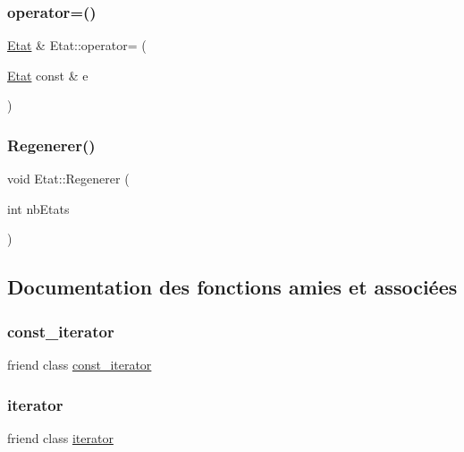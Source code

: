 \subsubsection{\texorpdfstring{operator=()}{operator=()}}
{\footnotesize\ttfamily \mbox{\hyperlink{class_etat}{Etat}} \& Etat\+::operator= (\begin{DoxyParamCaption}\item[{\mbox{\hyperlink{class_etat}{Etat}} const \&}]{e }\end{DoxyParamCaption})}

\mbox{\label{class_etat_ad8cd3d55140d2b46784cb7623e998ee4}} 
\subsubsection{\texorpdfstring{Regenerer()}{Regenerer()}}
{\footnotesize\ttfamily void Etat\+::\+Regenerer (\begin{DoxyParamCaption}\item[{int}]{nb\+Etats }\end{DoxyParamCaption})}



\subsection{Documentation des fonctions amies et associées}
\mbox{\label{class_etat_ac220ce1c155db1ac44146c12d178056f}} 
\subsubsection{\texorpdfstring{const\+\_\+iterator}{const\_iterator}}
{\footnotesize\ttfamily friend class \mbox{\hyperlink{class_etat_1_1const__iterator}{const\+\_\+iterator}}\hspace{0.3cm}{\ttfamily [friend]}}

\mbox{\label{class_etat_a67171474c4da6cc8efe0c7fafefd2b2d}} 
\subsubsection{\texorpdfstring{iterator}{iterator}}
{\footnotesize\ttfamily friend class \mbox{\hyperlink{class_etat_1_1iterator}{iterator}}\hspace{0.3cm}{\ttfamily [friend]}}




